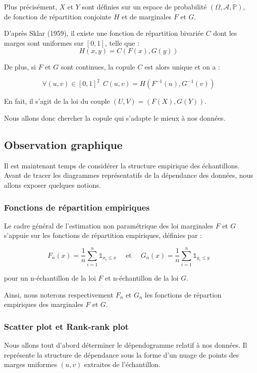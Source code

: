 Plus précisément, $X$ et $Y$  sont définies sur un espace de probabilité $(\Omega,\mathcal{A},\mathbb{P})$, de fonction de répartition conjointe $H$ et de marginales $F$ et $G$.

D'après Sklar (1959), il existe une fonction de répartition bivariée $C$ dont les marges sont uniformes sur $[0,1]$, telle que :
$$
H(x,y) = C(F(x),G(y))
$$

De plus, si $F$ et $G$ sont continues, la copule $C$ est alors unique et on a :

$$
\forall (u,v) \in [0,1]^2 ~~ C(u,v) = H(F^{-1}(u),G^{-1}(v))
$$

En fait, il s'agit de la loi du couple $(U,V) = (F(X),G(Y))$.

Nous allons donc chercher la copule qui s’adapte le mieux à nos données.




\subsection{Observation graphique}

Il est maintenant temps de considérer la structure empirique des échantillons. Avant de tracer les diagrammes représentatifs de 
la dépendance des données, nous allons exposer quelques notions.


\subsubsection{Fonctions de répartition empiriques}

Le cadre général de l’estimation non paramétrique des loi marginales $F$ et $G$ s’appuie sur les fonctions de répartition empiriques, définies par :

$$
F_n(x) = \frac{1}{n} \sum_{i=1}^n \mathbb{1}_{x_i \leq x}
\text{~~~~et~~~~}
G_n(x) = \frac{1}{n} \sum_{i=1}^n \mathbb{1}_{y_i \leq y}
$$

pour un n-échantillon de la loi $F$ et n-échantillon de la loi $G$.

Ainsi, nous noterons respectivement $F_n$ et $G_n$ les fonctions de répartion empiriques des marginales $F$ et $G$.


\subsubsection{Scatter plot et Rank-rank plot}

Nous allons tout d'abord déterminer le dépendogramme relatif à nos données.
Il représente la structure de dépendance sous la forme d'un nuage de points des marges uniformes $(u,v)$ extraites de l'échantillon.

